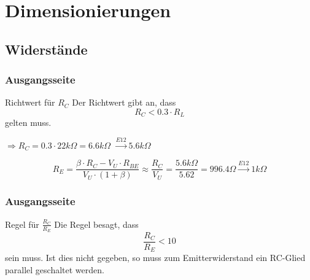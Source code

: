 \section{Dimensionierungen}

\subsection{Widerstände}

\begin{frame}
	\frametitle{Ausgangsseite}
		\begin{block}{Richtwert für $R_C$}
			Der Richtwert gibt an, dass
			\[R_C < 0.3 \cdot R_L \]
			gelten muss.
		\end{block}
			$\Rightarrow R_C = 0.3 \cdot 22k \Omega = 6.6k \Omega$
			$\xrightarrow{E12} 5.6k \Omega$

		\[ R_E = \frac{\beta \cdot R_C - V_U \cdot R_{BE}}
		{V_U \cdot (1+\beta)} \approx \frac{R_C}{V_U} =
		\frac{5.6k \Omega}{5.62} = 
		996.4 \Omega \xrightarrow{E12} 1k \Omega \]
\end{frame}

\begin{frame}
	\frametitle{Ausgangsseite}
		\begin{block}{Regel für $\frac{R_C}{R_E}$}
			Die Regel besagt, dass 
			\[ \frac{R_C}{R_E} < 10 \]
			sein muss. Ist dies nicht gegeben, so muss zum
			Emitterwiderstand ein RC-Glied parallel geschaltet
			werden.	
		\end{block}
				
\end{frame}
